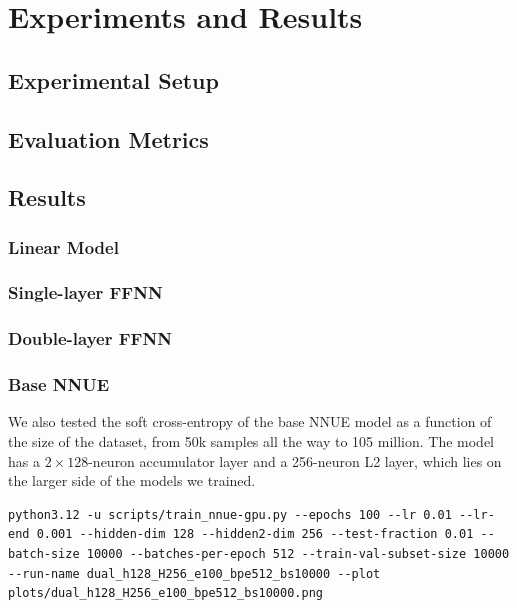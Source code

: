 \chapter{Experiments and Results}\label{ch:experiments}

\section{Experimental Setup}\label{sec:setup}

\section{Evaluation Metrics}\label{sec:metrics}

\section{Results}\label{sec:results}

\subsection{Linear Model}\label{sec:res-linear}

\subsection{Single-layer FFNN}\label{sec:res-ffnn1}

\subsection{Double-layer FFNN}\label{sec:res-ffnn2}

\subsection{Base NNUE}\label{sec:res-base}

We also tested the soft cross-entropy of the base NNUE model as a function of the size of the dataset, from 50k samples all the way to 105 million. The model has a \(2\times 128\)-neuron accumulator layer and a 256-neuron L2 layer, which lies on the larger side of the models we trained.

\begin{lstlisting}[basicstyle=\ttfamily\footnotesize,breaklines=true]
python3.12 -u scripts/train_nnue-gpu.py --epochs 100 --lr 0.01 --lr-end 0.001 --hidden-dim 128 --hidden2-dim 256 --test-fraction 0.01 --batch-size 10000 --batches-per-epoch 512 --train-val-subset-size 10000 --run-name dual_h128_H256_e100_bpe512_bs10000 --plot plots/dual_h128_H256_e100_bpe512_bs10000.png
\end{lstlisting}

